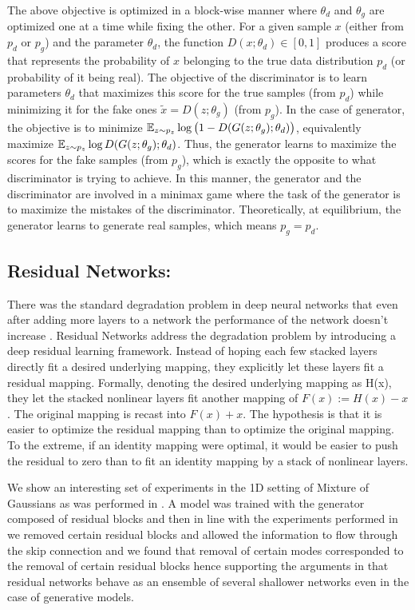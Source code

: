 The above objective is optimized in a block-wise manner where $\theta_d$ and $\theta_g$ are optimized one at a time while fixing the other. For a given sample $x$ (either from $p_d$ or $p_g$) and the parameter $\theta_d$, the function $D(x; \theta_d) \in [0, 1]$ produces a score that represents the probability of $x$ belonging to the true data distribution $p_d$ (or probability of it being real). The objective of the discriminator is to learn parameters $\theta_d$ that maximizes this score for the true samples (from $p_d$) while minimizing it for the fake ones $\tilde{x} = D(z; \theta_g)$ (from $p_g$). In the case of generator, the objective is to minimize $\operatorname{\mathbb{E}}_{z \sim p_z}\log \big( 1 - D(G(z; \theta_g) ; \theta_d) \big)$, equivalently maximize $\operatorname{\mathbb{E}}_{z \sim p_z} \log D(G(z; \theta_g) ; \theta_d)$. Thus, the generator learns to maximize the scores for the fake samples (from $p_g$), which is exactly the opposite to what discriminator is trying to achieve. In this manner, the generator and the discriminator are involved in a minimax game where the task of the generator is to maximize the mistakes of the discriminator. Theoretically, at equilibrium, the generator learns to generate real samples, which means $p_g = p_d$.

\subsection*{Residual Networks:}
There was the standard degradation problem in deep neural networks that even after adding more layers to a network the performance of the network doesn't increase . Residual Networks\cite{he2016deep} address the degradation problem by introducing a deep residual learning framework. Instead of hoping each few stacked layers directly fit a desired underlying mapping, they explicitly let these layers fit a residual mapping. Formally, denoting the desired underlying mapping as H(x), they let the stacked nonlinear layers fit another mapping of $F(x):=H(x)-x$. The original mapping is recast into $F(x)+x$. The hypothesis is that it is easier to optimize the residual mapping than to optimize the original mapping. To the extreme, if an identity mapping were optimal, it would be easier to push the residual to zero than to fit an identity mapping by a stack of nonlinear layers.


We show an interesting set of experiments in the 1D setting of Mixture of Gaussians as was performed in \cite{ghosh2017multi}. A model was trained with the generator composed of residual blocks and then in line with the experiments performed in \cite{veit2016residual} we removed certain residual blocks and allowed the information to flow through the skip connection and we found that removal of certain modes corresponded to the removal of certain residual blocks hence supporting the arguments in \cite{veit2016residual} that residual networks behave as an ensemble of several shallower networks even in the case of generative models.


